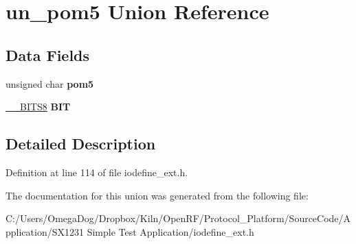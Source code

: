 \hypertarget{unionun__pom5}{\section{un\-\_\-pom5 Union Reference}
\label{unionun__pom5}
}
\subsection*{Data Fields}
\begin{DoxyCompactItemize}
\item 
\hypertarget{unionun__pom5_a3f34682fb8839792a8b03ff941f6b1f1}{unsigned char {\bfseries pom5}}\label{unionun__pom5_a3f34682fb8839792a8b03ff941f6b1f1}

\item 
\hypertarget{unionun__pom5_a044510902c0e455e53ba30cc51fefce9}{\hyperlink{struct_____b_i_t_s8}{\-\_\-\-\_\-\-B\-I\-T\-S8} {\bfseries B\-I\-T}}\label{unionun__pom5_a044510902c0e455e53ba30cc51fefce9}

\end{DoxyCompactItemize}


\subsection{Detailed Description}


Definition at line 114 of file iodefine\-\_\-ext.\-h.



The documentation for this union was generated from the following file\-:\begin{DoxyCompactItemize}
\item 
C\-:/\-Users/\-Omega\-Dog/\-Dropbox/\-Kiln/\-Open\-R\-F/\-Protocol\-\_\-\-Platform/\-Source\-Code/\-Application/\-S\-X1231 Simple Test Application/iodefine\-\_\-ext.\-h\end{DoxyCompactItemize}

